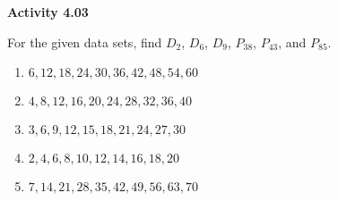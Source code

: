 \vspace{0.3ex}
\noindent\textbf{Activity 4.03}

\vspace{0.2ex}

For the given data sets, find \(D_2\), \(D_6\), \(D_9\), \(P_{38}\), \(P_{43}\), and \(P_{85}\).  

\begin{enumerate}
    \item \(6, 12, 18, 24, 30, 36, 42, 48, 54, 60\)  
    \item \(4, 8, 12, 16, 20, 24, 28, 32, 36, 40\)  
    \item \(3, 6, 9, 12, 15, 18, 21, 24, 27, 30\)  
    \item \(2, 4, 6, 8, 10, 12, 14, 16, 18, 20\)  
    \item \(7, 14, 21, 28, 35, 42, 49, 56, 63, 70\)  
\end{enumerate}
